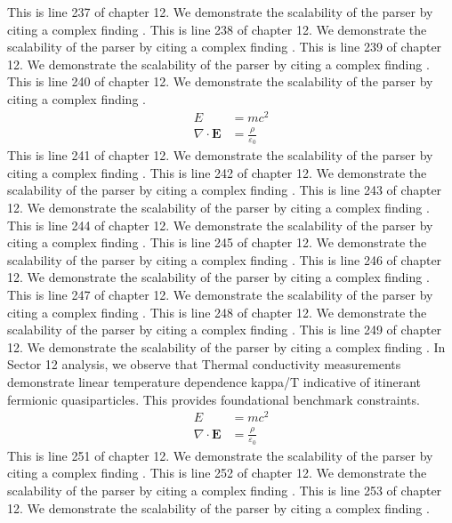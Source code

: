 This is line 237 of chapter 12. We demonstrate the scalability of the parser by citing a complex finding \cite{ref12_237}.
This is line 238 of chapter 12. We demonstrate the scalability of the parser by citing a complex finding \cite{ref12_238}.
This is line 239 of chapter 12. We demonstrate the scalability of the parser by citing a complex finding \cite{ref12_239}.
This is line 240 of chapter 12. We demonstrate the scalability of the parser by citing a complex finding \cite{ref12_240}.
\begin{align*}
  E &= mc^2 \\
  \nabla \cdot \mathbf{E} &= \frac{\rho}{\varepsilon_0}
\end{align*}
This is line 241 of chapter 12. We demonstrate the scalability of the parser by citing a complex finding \cite{ref12_241}.
This is line 242 of chapter 12. We demonstrate the scalability of the parser by citing a complex finding \cite{ref12_242}.
This is line 243 of chapter 12. We demonstrate the scalability of the parser by citing a complex finding \cite{ref12_243}.
This is line 244 of chapter 12. We demonstrate the scalability of the parser by citing a complex finding \cite{ref12_244}.
This is line 245 of chapter 12. We demonstrate the scalability of the parser by citing a complex finding \cite{ref12_245}.
This is line 246 of chapter 12. We demonstrate the scalability of the parser by citing a complex finding \cite{ref12_246}.
This is line 247 of chapter 12. We demonstrate the scalability of the parser by citing a complex finding \cite{ref12_247}.
This is line 248 of chapter 12. We demonstrate the scalability of the parser by citing a complex finding \cite{ref12_248}.
This is line 249 of chapter 12. We demonstrate the scalability of the parser by citing a complex finding \cite{ref12_249}.
In Sector 12 analysis, we observe that Thermal conductivity measurements demonstrate linear temperature dependence kappa/T indicative of itinerant fermionic quasiparticles. This provides foundational benchmark constraints.
\begin{align*}
  E &= mc^2 \\
  \nabla \cdot \mathbf{E} &= \frac{\rho}{\varepsilon_0}
\end{align*}
This is line 251 of chapter 12. We demonstrate the scalability of the parser by citing a complex finding \cite{ref12_251}.
This is line 252 of chapter 12. We demonstrate the scalability of the parser by citing a complex finding \cite{ref12_252}.
This is line 253 of chapter 12. We demonstrate the scalability of the parser by citing a complex finding \cite{ref12_253}.
